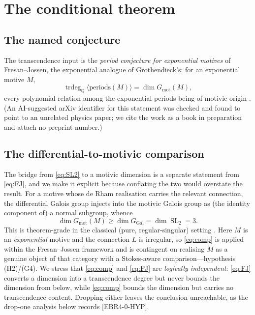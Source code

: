 \documentclass[11pt,reqno]{amsart}
\theoremstyle{plain}
\theoremstyle{definition}
\theoremstyle{remark}
\newcommand{\Q}{\mathbb{Q}}
\newcommand{\GGal}{G_{\mathrm{Gal}}}
\newcommand{\Gmot}{G_{\mathrm{mot}}}
\newcommand{\SL}{\operatorname{SL}}
\newcommand{\trdeg}{\operatorname{trdeg}}
\newcommand{\claim}[1]{\textsf{\small[#1]}}
\begin{document}
\section{The conditional theorem}\label{sec:theorem}

\subsection{The named conjecture}\label{sec:namedconj}
The transcendence input is the \emph{period conjecture for exponential motives}
of Fresan--Jossen, the exponential analogue of Grothendieck's: for an
exponential motive $M$,
\begin{equation}\label{eq:FJ}
  \trdeg_{\Q}\langle\text{periods}(M)\rangle=\dim\Gmot(M),
\end{equation}
every polynomial relation among the exponential periods being of motivic origin
\cite{FresanJossen,KZ,AndrePanoramas}. (An AI-suggested arXiv identifier for
this statement was checked and found to point to an unrelated physics paper; we
cite the work as a book in preparation and attach no preprint number.)

\subsection{The differential-to-motivic comparison}\label{sec:comparison}
The bridge from \eqref{eq:SL2} to a motivic dimension is a separate statement
from \eqref{eq:FJ}, and we make it explicit because conflating the two would
overstate the result. For a motive whose de Rham realisation carries the
relevant connection, the differential Galois group injects into the motivic
Galois group as (the identity component of) a normal subgroup, whence
\begin{equation}\label{eq:comp}
  \dim\Gmot(M)\ge\dim\GGal=\dim\SL_{2}=3.
\end{equation}
This is theorem-grade in the classical (pure, regular-singular) setting
\cite{AndreIHES,AndrePanoramas,AndreENS}. Here $M$ is an \emph{exponential}
motive and the connection $L$ is irregular, so \eqref{eq:comp} is applied within
the Fresan--Jossen framework and is contingent on realising $M$ as a genuine
object of that category with a Stokes-aware comparison---hypothesis (H2)/(G4).
We stress that \eqref{eq:comp} and \eqref{eq:FJ} are \emph{logically
independent}: \eqref{eq:FJ} converts a dimension into a transcendence degree but
never bounds the dimension from below, while \eqref{eq:comp} bounds the
dimension but carries no transcendence content. Dropping either leaves the
conclusion unreachable, as the drop-one analysis below records
\claim{EBR4-0-HYP}.
\end{document}
